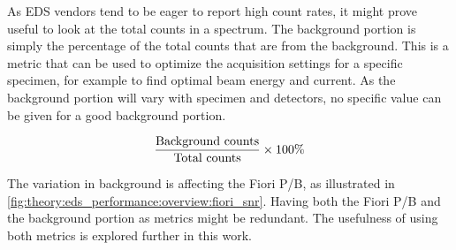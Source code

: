 

As EDS vendors tend to be eager to report high count rates, it might prove useful to look at the total counts in a spectrum.
The background portion is simply the percentage of the total counts that are from the background.
This is a metric that can be used to optimize the acquisition settings for a specific specimen, for example to find optimal beam energy and current.
As the background portion will vary with specimen and detectors, no specific value can be given for a good background portion.

\begin{equation}
    \label{eq:theory:eds_performance:background_portion}
    \frac{\textnormal{Background counts}}{\textnormal{Total counts}} \times 100\%
\end{equation}


The variation in background is affecting the Fiori P/B, as illustrated in \cref{fig:theory:eds_performance:overview:fiori_snr}.
Having both the Fiori P/B and the background portion as metrics might be redundant.
The usefulness of using both metrics is explored further in this work.








